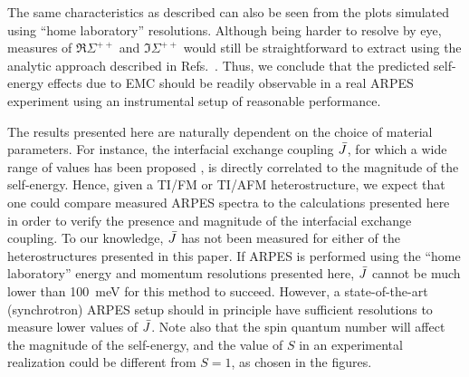 \documentclass[aps, prb, twocolumn,amsmath,amssymb,floatfix]{revtex4-2}
\begin{document}
The same characteristics as described can also be seen from the plots simulated using ``home laboratory'' resolutions. Although being harder to resolve by eye, measures of $\Re\Sigma^{++}$ and $\Im\Sigma^{++}$ would still be straightforward to extract using the analytic approach described in Refs.~\cite{Pletikosic2012finding,Mazzola2017strong}. Thus, we conclude that the predicted self-energy effects due to EMC should be readily observable in a real ARPES experiment using an instrumental setup of reasonable performance.

The results presented here are naturally dependent on the choice of material parameters. For instance, the interfacial exchange coupling $\Bar{J}$, for which a wide range of values has been proposed \cite{EirikTIFMAFM, thingstad2021eliashberg, AFMNMAFMArnePRB, FMNMFMArnePRB, magetizationdynamics, strongJbarPRL}, is directly correlated to the magnitude of the self-energy. Hence, given a TI/FM or TI/AFM heterostructure, we expect that one could compare measured ARPES spectra to the calculations presented here in order to verify the presence and magnitude of the interfacial exchange coupling.
To our knowledge, $\Bar{J}$ has not been measured for either of the heterostructures presented in this paper. If ARPES is performed using the ``home laboratory'' energy and momentum resolutions presented here, $\Bar{J}$ cannot be much lower than 100~meV for this method to succeed. However, a state-of-the-art (synchrotron) ARPES setup should in principle have sufficient resolutions to measure lower values of $\Bar{J}$. Note also that the spin quantum number will affect the magnitude of the self-energy, and the value of $S$ in an experimental realization could be different from $S=1$, as chosen in the figures.



\end{document}
